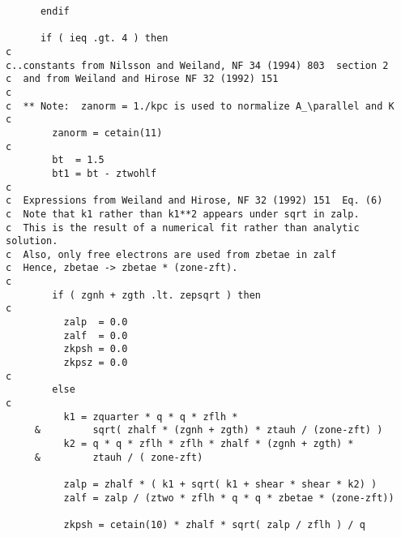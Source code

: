 \begin{verbatim}
      endif

      if ( ieq .gt. 4 ) then
c
c..constants from Nilsson and Weiland, NF 34 (1994) 803  section 2
c  and from Weiland and Hirose NF 32 (1992) 151
c
c  ** Note:  zanorm = 1./kpc is used to normalize A_\parallel and K
c
        zanorm = cetain(11)
c
        bt  = 1.5
        bt1 = bt - ztwohlf
c
c  Expressions from Weiland and Hirose, NF 32 (1992) 151  Eq. (6)
c  Note that k1 rather than k1**2 appears under sqrt in zalp.
c  This is the result of a numerical fit rather than analytic solution.
c  Also, only free electrons are used from zbetae in zalf
c  Hence, zbetae -> zbetae * (zone-zft).
c
        if ( zgnh + zgth .lt. zepsqrt ) then
c
          zalp  = 0.0
          zalf  = 0.0
          zkpsh = 0.0
          zkpsz = 0.0
c
        else
c
          k1 = zquarter * q * q * zflh *
     &         sqrt( zhalf * (zgnh + zgth) * ztauh / (zone-zft) )
          k2 = q * q * zflh * zflh * zhalf * (zgnh + zgth) *
     &         ztauh / ( zone-zft)

          zalp = zhalf * ( k1 + sqrt( k1 + shear * shear * k2) )
          zalf = zalp / (ztwo * zflh * q * q * zbetae * (zone-zft))

          zkpsh = cetain(10) * zhalf * sqrt( zalp / zflh ) / q


\end{verbatim}
